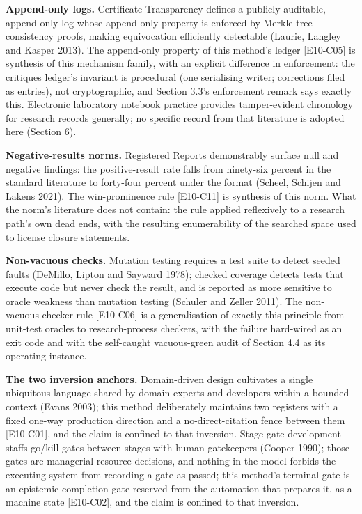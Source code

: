 \documentclass[
  11pt,
]{article}
\begin{document}
\textbf{Append-only logs.} Certificate Transparency defines a publicly
auditable, append-only log whose append-only property is enforced by
Merkle-tree consistency proofs, making equivocation efficiently
detectable (Laurie, Langley and Kasper 2013). The append-only property
of this method's ledger {[}E10-C05{]} is synthesis of this mechanism
family, with an explicit difference in enforcement: the critiques
ledger's invariant is procedural (one serialising writer; corrections
filed as entries), not cryptographic, and Section 3.3's enforcement
remark says exactly this. Electronic laboratory notebook practice
provides tamper-evident chronology for research records generally; no
specific record from that literature is adopted here (Section 6).

\textbf{Negative-results norms.} Registered Reports demonstrably surface
null and negative findings: the positive-result rate falls from
ninety-six percent in the standard literature to forty-four percent
under the format (Scheel, Schijen and Lakens 2021). The win-prominence
rule {[}E10-C11{]} is synthesis of this norm. What the norm's literature
does not contain: the rule applied reflexively to a research path's own
dead ends, with the resulting enumerability of the searched space used
to license closure statements.

\textbf{Non-vacuous checks.} Mutation testing requires a test suite to
detect seeded faults (DeMillo, Lipton and Sayward 1978); checked
coverage detects tests that execute code but never check the result, and
is reported as more sensitive to oracle weakness than mutation testing
(Schuler and Zeller 2011). The non-vacuous-checker rule {[}E10-C06{]} is
a generalisation of exactly this principle from unit-test oracles to
research-process checkers, with the failure hard-wired as an exit code
and with the self-caught vacuous-green audit of Section 4.4 as its
operating instance.

\textbf{The two inversion anchors.} Domain-driven design cultivates a
single ubiquitous language shared by domain experts and developers
within a bounded context (Evans 2003); this method deliberately
maintains two registers with a fixed one-way production direction and a
no-direct-citation fence between them {[}E10-C01{]}, and the claim is
confined to that inversion. Stage-gate development staffs go/kill gates
between stages with human gatekeepers (Cooper 1990); those gates are
managerial resource decisions, and nothing in the model forbids the
executing system from recording a gate as passed; this method's terminal
gate is an epistemic completion gate reserved from the automation that
prepares it, as a machine state {[}E10-C02{]}, and the claim is confined
to that inversion.
\end{document}
